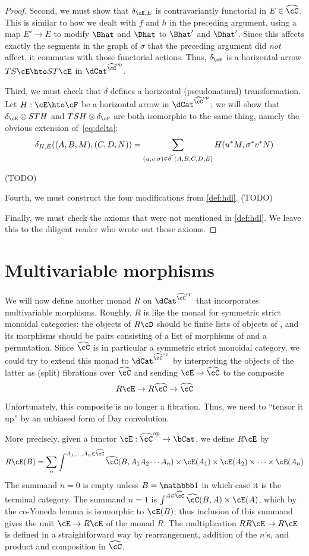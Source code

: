 \documentclass{amsart}
\newcommand{\C}{\cC}
\renewcommand{\Chat}{\ensuremath{\widehat{\C}}\xspace}
\newcommand{\thchk}{\ensuremath{\widecheck{\theta}}\xspace}
\newcommand{\E}{\cE}
\newcommand{\F}{\cF}
\newcommand{\one}{\done}
\begin{document}
\begin{proof}
  Second, we must show that $\delta_{\E,E}$ is contravariantly functorial in $E\in\Chat$.
  This is similar to how we dealt with $f$ and $h$ in the preceding argument, using a map $E'\to E$ to modify $\Bhat$ and $\Dhat$ to $\Bhat'$ and $\Dhat'$.
  Since this affects exactly the segments in the graph of $\sigma$ that the preceding argument did \emph{not} affect, it commutes with those functorial actions.
  Thus, $\delta_\E$ is a horizontal arrow $TS\E \hto ST\E$ in $\dCat^{\Chat\op}$.

  Third, we must check that $\delta$ defines a horizontal (pseudonatural) transformation.
  Let $H:\E\hto \F$ be a horizontal arrow in $\dCat^{\Chat\op}$; we will show that $\delta_\E \otimes STH$ and $TSH\otimes \delta_\F$ are both isomorphic to the same thing, namely the obvious extension of~\eqref{eq:delta}:
  \[ \delta_{H,E}((A,B,M),(C,D,N)) = \sum_{(u,v,\sigma)\in \thchk(A,B,C,D,E)} H(u^*M,\sigma^*v^*N) \]

  (TODO)

  Fourth, we must construct the four modifications from \cref{def:hdl}.
  (TODO)

  Finally, we must check the axioms that were not mentioned in \cref{def:hdl}.
  We leave this to the diligent reader who wrote out those axioms.
\end{proof}

\section{Multivariable morphisms}
\label{sec:multivar}

We will now define another monad $R$ on $\dCat^{\Chat\op}$ that incorporates multivariable morphisms.
Roughly, $R$ is like the monad for symmetric strict monoidal categories: the objects of $R\cD$ should be finite lists of objects of \cD, and its morphisms should be pairs consisting of a list of morphisms of \cD and a permutation.
Since \Chat is in particular a symmetric strict monoidal category, we could try to extend this monad to $\dCat^{\Chat\op}$ by interpreting the objects of the latter as (split) fibrations over $\Chat$ and sending $\E\to \Chat$ to the composite
\[ R\E \to R\Chat \to \Chat \]
Unfortunately, this composite is no longer a fibration.
Thus, we need to ``tensor it up'' by an unbiased form of Day convolution.

More precisely, given a functor $\E:\Chat\op\to \bCat$, we define $R\E$ by
\[ R\E(B) = \sum_n \int^{A_1,\dots,A_n\in\Chat} \Chat(B,A_1 A_2\cdots A_n) \times \E(A_1)\times \E(A_2)\times \cdots\times \E(A_n) \]
The summand $n=0$ is empty unless $B=\one$ in which case it is the terminal category.
The summand $n=1$ is $\int^{A\in\Chat} \Chat(B,A) \times \E(A)$, which by the co-Yoneda lemma is isomorphic to $\E(B)$; thus inclusion of this summand gives the unit $\E\to R\E$ of the monad $R$.
The multiplication $RR\E\to R\E$ is defined in a straightforward way by rearrangement, addition of the $n$'s, and product and composition in $\Chat$.
\end{document}
